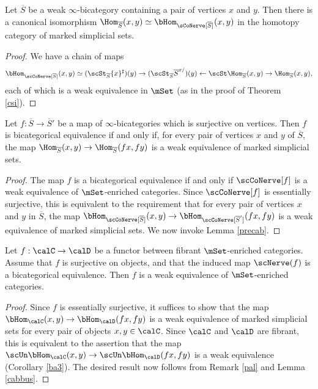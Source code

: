\begin{lemma}\label{precab}
Let $\overline{S}$ be a weak $\infty$-bicategory containing a pair of vertices $x$ and $y$.
Then there is a canonical isomorphism
$\Hom_{ \overline{S} }(x,y) \simeq \bHom_{ \sCoNerve[ \overline{S}]}(x,y)$ in the homotopy category of marked simplicial sets.
\end{lemma}

\begin{proof}
We have a chain of maps
$$\bHom_{ \scCoNerve[ \overline{S}]}(x,y) \simeq
(\scSt_{ \overline{S}} \{x\}^{\sharp})(y) \rightarrow (\scSt_{ \overline{S}} \overline{S}^{x/})(y) \leftarrow \scSt \Hom_{\overline{S}}(x,y) \rightarrow \Hom_{ \overline{S}}(x,y),$$
each of which is a weak equivalence in $\mSet$ (as in the proof of Theorem \ref{csi}).
\end{proof}

\begin{lemma}\label{cabbus}
Let $f: \overline{S} \rightarrow \overline{S}'$ be a map of $\infty$-bicategories which is surjective on vertices. Then $f$ is bicategorical equivalence if and only if, for every pair of vertices
$x$ and $y$ of $\overline{S}$, the map $\Hom_{ \overline{S} }(x,y) \rightarrow
\Hom_{ \overline{S}}( fx, fy)$ is a weak equivalence of marked simplicial sets.
\end{lemma}

\begin{proof}
The map $f$ is a bicategorical equivalence if and only if $\scCoNerve[f]$ is a weak equivalence of $\mSet$-enriched categories. Since $\scCoNerve[f]$ is essentially surjective, this is equivalent
to the requirement that for every pair of vertices $x$ and $y$ in $\overline{S}$, the map
$\bHom_{ \scCoNerve[ \overline{S} ]}(x,y) \rightarrow \bHom_{ \scCoNerve[ \overline{S}']}(fx,fy)$ is a weak equivalence of marked simplicial sets. We now invoke Lemma \ref{precab}.
\end{proof}

\begin{lemma}\label{kilpus}
Let $f: \calC \rightarrow \calD$ be a functor between fibrant $\mSet$-enriched categories.
Assume that $f$ is surjective on objects, and that the induced map $\scNerve(f)$ is a bicategorical equivalence. Then $f$ is a weak equivalence of $\mSet$-enriched categories.
\end{lemma}

\begin{proof}
Since $f$ is essentially surjective, it suffices to show that the map
$\bHom_{\calC}(x,y) \rightarrow \bHom_{\calD}(fx,fy)$ is a weak equivalence of marked simplicial sets for every pair of objects $x,y \in \calC$. Since $\calC$ and $\calD$ are fibrant, this is equivalent to the assertion that the map $\scUn \bHom_{\calC}(x,y) \rightarrow \scUn \bHom_{\calD}(fx,fy)$ is a weak equivalence (Corollary \ref{ba3}). The desired result now follows from Remark \ref{pal} and Lemma \ref{cabbus}.
\end{proof}

